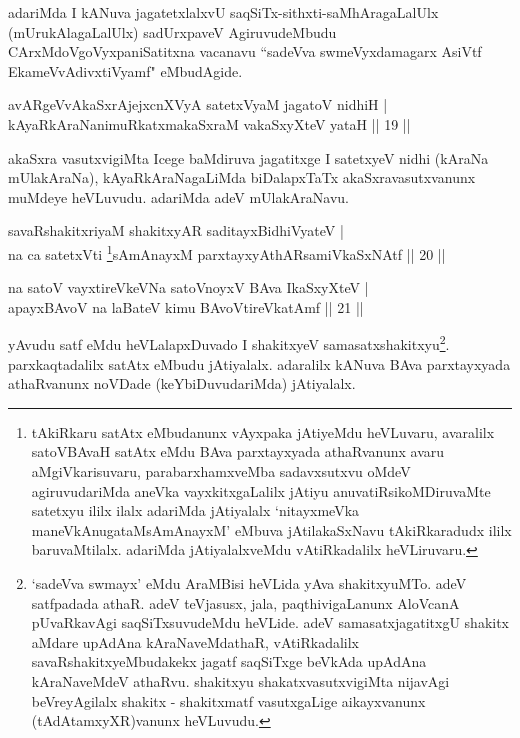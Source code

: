 \begin{artha}
adariMda I kANuva jagatetxlalxvU saqSiTx-sithxti-saMhAragaLalUlx (mUrukAlagaLalUlx) sadUrxpaveV AgiruvudeMbudu CArxMdoVgoVyxpaniSatitxna vacanavu ``sadeVva swmeVyxdamagarx AsiVtf EkameVvAdivxtiVyamf" eMbudAgide.
\end{artha}

\begin{shl}
avARgeVvAkaSxrAjejxcnXVyA satetxVyaM jagatoV nidhiH |\\
kAyaRkAraNanimuRkatxmakaSxraM vakaSxyXteV yataH \hfill || 19 ||
\end{shl}

\begin{artha}
akaSxra vasutxvigiMta Icege baMdiruva jagatitxge I satetxyeV nidhi (kAraNa mUlakAraNa), kAyaRkAraNagaLiMda biDalapxTaTx akaSxravasutxvanunx muMdeye heVLuvudu. adariMda adeV mUlakAraNavu.
\end{artha}

\begin{shl}
savaRshakitxriyaM shakitxyAR saditayxBidhiVyateV |\\
na ca satetxVti \footnote{tAkiRkaru satAtx eMbudanunx vAyxpaka jAtiyeMdu heVLuvaru, avaralilx satoVBAvaH satAtx eMdu BAva parxtayxyada athaRvanunx avaru aMgiVkarisuvaru, parabarxhamxveMba sadavxsutxvu oMdeV agiruvudariMda aneVka vayxkitxgaLalilx jAtiyu anuvatiRsikoMDiruvaMte satetxyu ililx ilalx adariMda jAtiyalalx `nitayxmeVka maneVkAnugataMsAmAnayxM' eMbuva jAtilakaSxNavu tAkiRkaradudx ililx baruvaMtilalx. adariMda jAtiyalalxveMdu vAtiRkadalilx heVLiruvaru.}sAmAnayxM parxtayxyAthARsamiVkaSxNAtf \hfill || 20 ||
\end{shl}

\begin{shl}
na satoV vayxtireVkeVNa satoV\s noyxV BAva IkaSxyXteV |\\
apayxBAvoV na laBateV kimu BAvoV\s tireVkatAmf \hfill || 21 ||
\end{shl}

\begin{artha}
yAvudu satf eMdu heVLalapxDuvado I shakitxyeV samasatxshakitxyu\footnote{`sadeVva swmayx' eMdu AraMBisi heVLida yAva shakitxyuMTo.  adeV satfpadada athaR. adeV teVjasusx, jala, paqthivigaLanunx AloVcanA pUvaRkavAgi saqSiTxsuvudeMdu heVLide. adeV samasatxjagatitxgU shakitx aMdare upAdAna kAraNaveMdathaR, vAtiRkadalilx savaRshakitxyeMbudakekx jagatf saqSiTxge beVkAda upAdAna kAraNaveMdeV athaRvu. shakitxyu shakatxvasutxvigiMta nijavAgi beVreyAgilalx shakitx - shakitxmatf vasutxgaLige aikayxvanunx (tAdAtamxyXR)vanunx heVLuvudu.}. parxkaqtadalilx satAtx eMbudu jAtiyalalx. adaralilx kANuva BAva parxtayxyada athaRvanunx noVDade (keYbiDuvudariMda) jAtiyalalx.
\end{artha}

